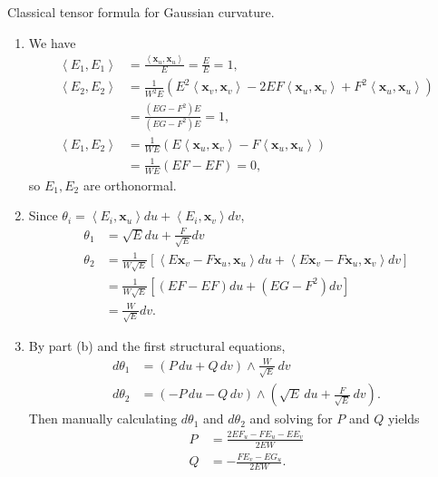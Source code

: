 \documentclass[10pt]{report}
\begin{document}
\pagebreak
\begin{exer}[7.2: 9]
Classical tensor formula for Gaussian curvature.
\end{exer}
\begin{enumerate}
	\item We have
		\begin{align*}
			\left\langle E_1,E_1 \right\rangle&=\frac{\left\langle \mathbf{x}_{u},\mathbf{x}_{u} \right\rangle}{E} = \frac{E}{E} =1,\\
			\left\langle E_2,E_2 \right\rangle&=\frac{1}{W^2 E} \left( E^2\left\langle \mathbf{x}_{v},\mathbf{x}_{v} \right\rangle-2EF\left\langle \mathbf{x}_{u},\mathbf{x}_{v}\right\rangle+ F^2\left\langle \mathbf{x}_{u},\mathbf{x}_{u} \right\rangle \right) \\
							  &= \frac{(EG-F^2)E}{(EG-F^2)E} =1,\\
			\left\langle E_1,E_2 \right\rangle &= \frac{1}{WE} \left( E\left\langle \mathbf{x}_{u},\mathbf{x}_{v} \right\rangle -F\left\langle \mathbf{x}_{u},\mathbf{x}_{u} \right\rangle \right) \\
							   &= \frac{1}{WE} (EF-EF)=0,
		\end{align*} so $E_1,E_2$ are orthonormal.

	\item Since $\theta_i = \left\langle E_i,\mathbf{x}_{u} \right\rangle du + \left\langle E_i,\mathbf{x}_{v} \right\rangle dv$,
		\begin{align*}
			\theta_1 &= \sqrt{E} du+\frac{F}{\sqrt{E} } dv \\
			\theta_2 &= \frac{1}{W\sqrt{E} } \left[ \left\langle E\mathbf{x}_{v}-F\mathbf{x}_{u},\mathbf{x}_{u} \right\rangle du + \left\langle E\mathbf{x}_{v}-F\mathbf{x}_{u},\mathbf{x}_{v} \right\rangle dv \right] \\
				 &= \frac{1}{W\sqrt{E} } \left[ (EF-EF)du + (EG-F^2)dv \right]\\
				 &= \frac{W}{\sqrt{E} } dv.
		\end{align*}
	\item By part (b) and the first structural equations,
		\begin{align*}
			d\theta_1 &= (P\,du+Q\,dv) \wedge \frac{W}{\sqrt{E} } \,dv \\
			d\theta_2 &= (-P\,du-Q\,dv) \wedge (\sqrt{E} \,du + \frac{F}{\sqrt{E} } \,dv).
		\end{align*}
		Then manually calculating $d\theta_1$ and $d\theta_2$ and solving for $P$ and $Q$ yields
		\begin{align*}
			P &= \frac{2EF_{u}-FE_{u}-EE_{v}}{2EW} \\
			Q &= -\frac{FE_{v}-EG_{u}}{2EW} .
		\end{align*}


\end{enumerate}
\end{document}
